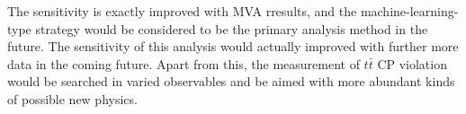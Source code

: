 		The sensitivity is exactly improved with MVA rresults, and the machine-learning-type strategy would be considered to be the primary analysis method in the future. The sensitivity of this analysis would actually improved with further more data in the coming future. Apart from this, the measurement of $t\bar{t}$ CP violation would be searched in varied observables and be aimed with more abundant kinds of possible new physics.
		

\FloatBarrier
